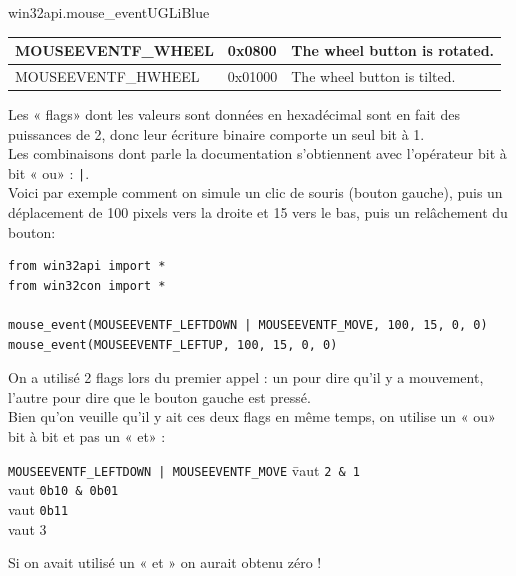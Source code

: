 \documentclass[a4paper,10pt,cours,firamath]{nsi}
\begin{document}
\begin{encadrecolore}{win32api.mouse\_event}{UGLiBlue}
\begin{center}
\begin{tabularx}{\textwidth}{|l|l|X|}
			MOUSEEVENTF\_WHEEL          & 
			0x0800                      & 
			The wheel button is rotated.                                                                                                                                                                                                                                                                                                                                                                                                                                                                              \\\hline
			MOUSEEVENTF\_HWHEEL         & 
			0x01000                     & 
			The wheel button is tilted.                                                                                                                                                                                                                                                                                                                                                                                                                                                                               \\\hline
		\end{tabularx}
	\end{center}
\end{encadrecolore}
Les « flags» dont les valeurs sont données en hexadécimal sont en fait des puissances de 2, donc leur écriture binaire comporte un seul bit à 1.\\
Les combinaisons dont parle la documentation s'obtiennent avec l'opérateur bit à bit « ou» : \texttt{|}.\\
Voici par exemple comment on simule un clic de souris (bouton gauche), puis un déplacement de 100 pixels vers la droite et 15 vers le bas, puis un relâchement du bouton:

\begin{pyc}
	\begin{verbatim}
from win32api import *
from win32con import *

mouse_event(MOUSEEVENTF_LEFTDOWN | MOUSEEVENTF_MOVE, 100, 15, 0, 0)
mouse_event(MOUSEEVENTF_LEFTUP, 100, 15, 0, 0)
\end{verbatim}
\end{pyc}

\begin{remarque}[]
	On a utilisé 2 flags lors du premier appel : un pour dire qu'il y a mouvement, l'autre pour dire que le bouton gauche est pressé.\\
	Bien qu'on veuille qu'il y ait ces deux flags en même temps, on utilise un « ou» bit à bit et pas un « et» :
	\begin{tabbing}
		\texttt{MOUSEEVENTF_LEFTDOWN | MOUSEEVENTF_MOVE} \= vaut \texttt{2 & 1}\\
		\> vaut \texttt{0b10 & 0b01}\\
		\> vaut \texttt{0b11}\\
		\> vaut 3
	\end{tabbing}
	Si on avait utilisé un « et »  on aurait obtenu zéro !
\end{remarque}
\end{document}
